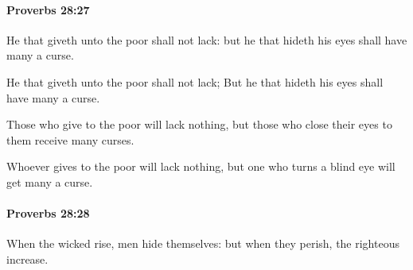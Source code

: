 		\paragraph{Proverbs 28:27} %
			\label{PROVERBS-28-27}

			He that giveth unto the poor shall not lack: but he that hideth his eyes shall have many a curse.

			\begin{versebox}
					\item[BHS] 
					\item[ASV] He that giveth unto the poor shall not lack; But he that hideth his eyes shall have many a curse.
					\item[NIV] Those who give to the poor will lack nothing, but those who close their eyes to them receive many curses.
					\item[NRSV] Whoever gives to the poor will lack nothing, but one who turns a blind eye will get many a curse.
			\end{versebox}

		\paragraph{Proverbs 28:28} %
			\label{PROVERBS-28-28}

			When the wicked rise, men hide themselves: but when they perish, the righteous increase.

